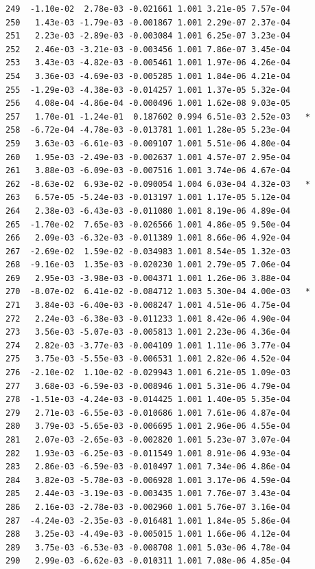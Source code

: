 \documentclass[
  letterpaper,
  DIV=11,
  numbers=noendperiod]{scrartcl}
\begin{document}
\begin{verbatim}
249  -1.10e-02  2.78e-03 -0.021661 1.001 3.21e-05 7.57e-04    
250   1.43e-03 -1.79e-03 -0.001867 1.001 2.29e-07 2.37e-04    
251   2.23e-03 -2.89e-03 -0.003084 1.001 6.25e-07 3.23e-04    
252   2.46e-03 -3.21e-03 -0.003456 1.001 7.86e-07 3.45e-04    
253   3.43e-03 -4.82e-03 -0.005461 1.001 1.97e-06 4.26e-04    
254   3.36e-03 -4.69e-03 -0.005285 1.001 1.84e-06 4.21e-04    
255  -1.29e-03 -4.38e-03 -0.014257 1.001 1.37e-05 5.32e-04    
256   4.08e-04 -4.86e-04 -0.000496 1.001 1.62e-08 9.03e-05    
257   1.70e-01 -1.24e-01  0.187602 0.994 6.51e-03 2.52e-03   *
258  -6.72e-04 -4.78e-03 -0.013781 1.001 1.28e-05 5.23e-04    
259   3.63e-03 -6.61e-03 -0.009107 1.001 5.51e-06 4.80e-04    
260   1.95e-03 -2.49e-03 -0.002637 1.001 4.57e-07 2.95e-04    
261   3.88e-03 -6.09e-03 -0.007516 1.001 3.74e-06 4.67e-04    
262  -8.63e-02  6.93e-02 -0.090054 1.004 6.03e-04 4.32e-03   *
263   6.57e-05 -5.24e-03 -0.013197 1.001 1.17e-05 5.12e-04    
264   2.38e-03 -6.43e-03 -0.011080 1.001 8.19e-06 4.89e-04    
265  -1.70e-02  7.65e-03 -0.026566 1.001 4.86e-05 9.50e-04    
266   2.09e-03 -6.32e-03 -0.011389 1.001 8.66e-06 4.92e-04    
267  -2.69e-02  1.59e-02 -0.034983 1.001 8.54e-05 1.32e-03    
268  -9.16e-03  1.35e-03 -0.020230 1.001 2.79e-05 7.06e-04    
269   2.95e-03 -3.98e-03 -0.004371 1.001 1.26e-06 3.88e-04    
270  -8.07e-02  6.41e-02 -0.084712 1.003 5.30e-04 4.00e-03   *
271   3.84e-03 -6.40e-03 -0.008247 1.001 4.51e-06 4.75e-04    
272   2.24e-03 -6.38e-03 -0.011233 1.001 8.42e-06 4.90e-04    
273   3.56e-03 -5.07e-03 -0.005813 1.001 2.23e-06 4.36e-04    
274   2.82e-03 -3.77e-03 -0.004109 1.001 1.11e-06 3.77e-04    
275   3.75e-03 -5.55e-03 -0.006531 1.001 2.82e-06 4.52e-04    
276  -2.10e-02  1.10e-02 -0.029943 1.001 6.21e-05 1.09e-03    
277   3.68e-03 -6.59e-03 -0.008946 1.001 5.31e-06 4.79e-04    
278  -1.51e-03 -4.24e-03 -0.014425 1.001 1.40e-05 5.35e-04    
279   2.71e-03 -6.55e-03 -0.010686 1.001 7.61e-06 4.87e-04    
280   3.79e-03 -5.65e-03 -0.006695 1.001 2.96e-06 4.55e-04    
281   2.07e-03 -2.65e-03 -0.002820 1.001 5.23e-07 3.07e-04    
282   1.93e-03 -6.25e-03 -0.011549 1.001 8.91e-06 4.93e-04    
283   2.86e-03 -6.59e-03 -0.010497 1.001 7.34e-06 4.86e-04    
284   3.82e-03 -5.78e-03 -0.006928 1.001 3.17e-06 4.59e-04    
285   2.44e-03 -3.19e-03 -0.003435 1.001 7.76e-07 3.43e-04    
286   2.16e-03 -2.78e-03 -0.002960 1.001 5.76e-07 3.16e-04    
287  -4.24e-03 -2.35e-03 -0.016481 1.001 1.84e-05 5.86e-04    
288   3.25e-03 -4.49e-03 -0.005015 1.001 1.66e-06 4.12e-04    
289   3.75e-03 -6.53e-03 -0.008708 1.001 5.03e-06 4.78e-04    
290   2.99e-03 -6.62e-03 -0.010311 1.001 7.08e-06 4.85e-04    

\end{verbatim}
\end{document}

